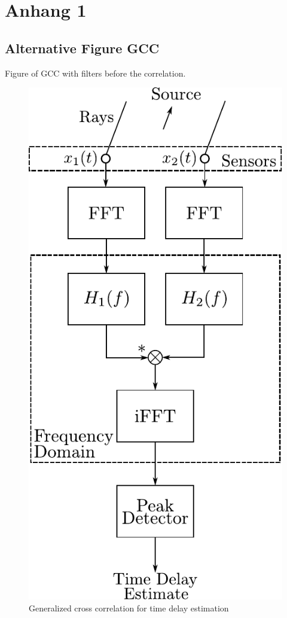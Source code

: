 \chapter{Anhang 1}
\label{chap:appendix1}

\section{Alternative Figure GCC}
\label{appendix:a1_alternativeGcc}

Figure of \ac{GCC} with filters before the correlation.
\begin{figure}[ht]
	\centering
		\includegraphics[width=0.35\columnwidth]{figures/GCC}
	\caption{Generalized cross correlation for time delay estimation}
	\label{fig:ap1_GCC}
\end{figure}


